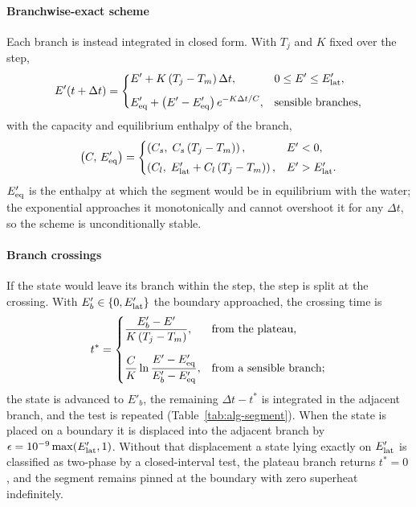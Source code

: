 \paragraph{Branchwise-exact scheme} Each branch is instead integrated in
closed form. With $T_j$ and $K$ fixed over the step,
\begin{equation}
  E'(t+\Delta t)=
  \begin{dcases}
    E'+K\left(T_j-T_m\right)\Delta t, & 0\le E'\le E'_{\mathrm{lat}},\\[4pt]
    E'_{\mathrm{eq}}+\left(E'-E'_{\mathrm{eq}}\right)e^{-K\Delta t/C}, & \text{sensible branches},
  \end{dcases}
  \label{eq:exact}
\end{equation}
with the capacity and equilibrium enthalpy of the branch,
\begin{equation}
  \left(C,\,E'_{\mathrm{eq}}\right)=
  \begin{cases}
    \left(C_s,\;C_s\left(T_j-T_m\right)\right), & E'<0,\\[3pt]
    \left(C_l,\;E'_{\mathrm{lat}}+C_l\left(T_j-T_m\right)\right), & E'>E'_{\mathrm{lat}} .
  \end{cases}
  \label{eq:Eeq}
\end{equation}
$E'_{\mathrm{eq}}$ is the enthalpy at which the segment would be in equilibrium with the
water; the exponential approaches it monotonically and cannot overshoot it for
any $\Delta t$, so the scheme is unconditionally stable.

\paragraph{Branch crossings} If the state would leave its branch within the
step, the step is split at the crossing. With $E'_b\in\{0,E'_{\mathrm{lat}}\}$ the
boundary approached, the crossing time is
\begin{equation}
  t^{*}=
  \begin{dcases}
    \frac{E'_b-E'}{K\left(T_j-T_m\right)}, & \text{from the plateau},\\[6pt]
    \frac{C}{K}\ln\frac{E'-E'_{\mathrm{eq}}}{E'_b-E'_{\mathrm{eq}}}, & \text{from a sensible branch};
  \end{dcases}
  \label{eq:crossing}
\end{equation}
the state is advanced to $E'_b$, the remaining $\Delta t-t^{*}$ is integrated
in the adjacent branch, and the test is repeated (Table~\ref{tab:alg-segment}).
When the state is placed on a boundary it is displaced into the adjacent
branch by $\epsilon=10^{-9}\max(E'_{\mathrm{lat}},1)$. Without that displacement a state
lying exactly on $E'_{\mathrm{lat}}$ is classified as two-phase by a closed-interval test,
the plateau branch returns $t^{*}=0$, and the segment remains pinned at the
boundary with zero superheat indefinitely.

